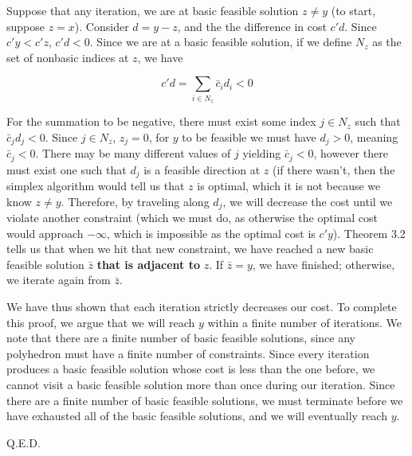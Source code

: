 \documentclass[11pt,a4paper]{article}
\begin{document}
Suppose that any iteration, we are at basic feasible solution $z\neq y$ (to start, suppose $z=x$). Consider $d=y-z$, and the the difference in cost $c'd$. Since $c'y<c'z$, $c'd<0$. Since we are at a basic feasible solution, if we define $N_z$ as the set of nonbasic indices at $z$, we have 

$$
c'd=\sum_{i\in N_z}\bar{c}_id_i<0
$$

For the summation to be negative, there must exist some index $j\in N_z$ such that $\bar{c}_jd_j<0$. Since $j\in N_z$, $z_j=0$, for $y$ to be feasible we must have $d_j>0$, meaning $\bar{c}_j<0$. There may be many different values of $j$ yielding $\bar{c}_j<0$, however there must exist one such that $d_j$ is a feasible direction at $z$ (if there wasn't, then the simplex algorithm would tell us that $z$ is optimal, which it is not because we know $z\neq y$. Therefore, by traveling along $d_j$, we will decrease the cost until we violate another constraint (which we must do, as otherwise the optimal cost would   approach $-\infty$, which is impossible as the optimal cost is $c'y$). Theorem 3.2 tells us that when we hit that new constraint, we have reached a new basic feasible solution $\bar{z}$ \textbf{that is adjacent to} $z$. If $\bar{z}=y$, we have finished; otherwise, we iterate again from $\bar{z}$.

We have thus shown that each iteration strictly decreases our cost. To complete this proof, we argue that we will reach $y$ within a finite number of iterations. We note that there are a finite number of basic feasible solutions, since any polyhedron must have a finite number of constraints. Since every iteration produces a basic feasible solution whose cost is less than the one before, we cannot visit a basic feasible solution more than once during our iteration. Since there are a finite number of basic feasible solutions, we must terminate before we have exhausted all of the basic feasible solutions, and we will eventually reach $y$.

Q.E.D.
\end{document}
